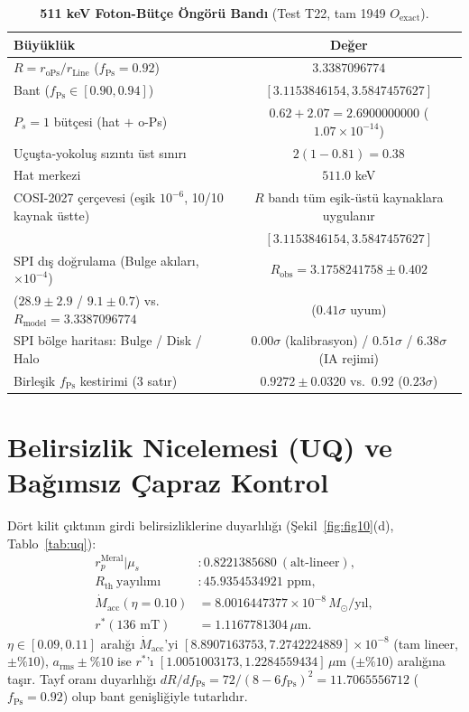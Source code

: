 \documentclass[12pt,a4paper]{article}
\begin{document}
\begin{table}[!htbp]
\centering
\footnotesize
\setlength{\tabcolsep}{3pt}
\caption{\textbf{511 keV Foton-Bütçe Öngörü Bandı} (Test T22, tam 1949 $O_{\mathrm{exact}}$).}
\label{tab:t22}
\vspace{0.1cm}
\begin{tabular}{@{}l|c@{}}
\hline
Büyüklük & Değer \\
\hline
$R = r_{\mathrm{oPs}}/r_{\mathrm{Line}}$ ($f_{\mathrm{Ps}}=0.92$) & $3.3387096774$ \\
Bant ($f_{\mathrm{Ps}}\in[0.90,0.94]$) & $[3.1153846154, 3.5847457627]$ \\
$P_s=1$ bütçesi (hat $+$ o-Ps) & $0.62 + 2.07 = 2.6900000000$ ($1.07\times 10^{-14}$) \\
Uçuşta-yokoluş sızıntı üst sınırı & $2(1-0.81) = 0.38$ \\
Hat merkezi & $511.0$ keV \\
COSI-2027 çerçevesi (eşik $10^{-6}$, 10/10 kaynak üstte) & $R$ bandı tüm eşik-üstü kaynaklara uygulanır \\
& $[3.1153846154, 3.5847457627]$ \\
SPI dış doğrulama (Bulge akıları, $\times10^{-4}$) & $R_{\mathrm{obs}}=3.1758241758\pm0.402$ \\
($28.9\pm2.9$ / $9.1\pm0.7$) vs.\ $R_{\mathrm{model}}=3.3387096774$ & ($0.41\sigma$ uyum) \\
SPI bölge haritası: Bulge / Disk / Halo & $0.00\sigma$ (kalibrasyon) / $0.51\sigma$ / $6.38\sigma$ (IA rejimi) \\
Birleşik $f_{\mathrm{Ps}}$ kestirimi (3 satır) & $0.9272\pm0.0320$ vs.\ $0.92$ ($0.23\sigma$) \\
\hline
\end{tabular}
\end{table}

\section{Belirsizlik Nicelemesi (UQ) ve Bağımsız Çapraz Kontrol}

Dört kilit çıktının girdi belirsizliklerine duyarlılığı (Şekil~\ref{fig:fig10}(d), Tablo~\ref{tab:uq}):
\begin{equation}
\begin{split}
r_p^{\mathrm{Meral}}|\mu_s &: 0.8221385680\ (\text{alt-lineer}), \\
R_{\mathrm{th}}\ \text{yayılımı} &: 45.9354534921\text{ ppm}, \\
\dot{M}_{\mathrm{acc}}(\eta=0.10) &= 8.0016447377\times 10^{-8}\,M_\odot\text{/yıl}, \\
r^*(136\text{ mT}) &= 1.1167781304\,\mu\text{m}.
\end{split}
\label{eq:uq}
\end{equation}
$\eta\in[0.09,0.11]$ aralığı $\dot{M}_{\mathrm{acc}}$'yi $[8.8907163753, 7.2742224889]\times 10^{-8}$ (tam lineer, $\pm\%10$), $a_{\mathrm{rms}}\pm\%10$ ise $r^*$'ı $[1.0051003173, 1.2284559434]\,\mu\text{m}$ ($\pm\%10$) aralığına taşır. Tayf oranı duyarlılığı $dR/df_{\mathrm{Ps}} = 72/(8-6f_{\mathrm{Ps}})^2 = 11.7065556712$ ($f_{\mathrm{Ps}}=0.92$) olup bant genişliğiyle tutarlıdır.
\end{document}
